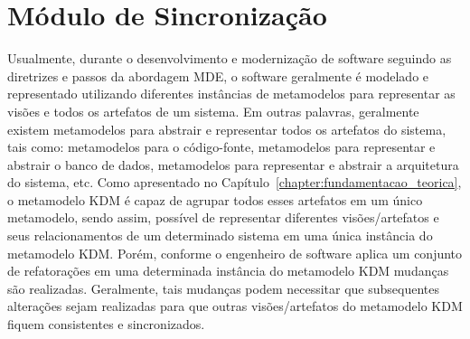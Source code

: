 \section{Módulo de Sincronização}\label{sec:modulo_de_sincronizacao_kdm_re}

Usualmente, durante o desenvolvimento e modernização de software seguindo as diretrizes e passos da abordagem MDE, o software geralmente é modelado e representado utilizando diferentes instâncias de metamodelos para representar as visões e todos os artefatos de um sistema. Em outras palavras, geralmente existem metamodelos para abstrair e representar todos os artefatos do sistema, tais como: metamodelos para o código-fonte, metamodelos para representar e abstrair o banco de dados, metamodelos para representar e abstrair a arquitetura do sistema, etc. Como apresentado no Capítulo~\ref{chapter:fundamentacao_teorica}, o metamodelo KDM é capaz de agrupar todos esses artefatos em um único metamodelo, sendo assim, possível de representar diferentes visões/artefatos e seus relacionamentos de um determinado sistema em uma única instância do metamodelo KDM. Porém, conforme o engenheiro de software aplica um conjunto de refatorações em uma determinada instância do metamodelo KDM mudanças são realizadas. Geralmente, tais mudanças podem necessitar que subsequentes alterações sejam realizadas para que outras visões/artefatos do metamodelo KDM fiquem consistentes e sincronizados.

